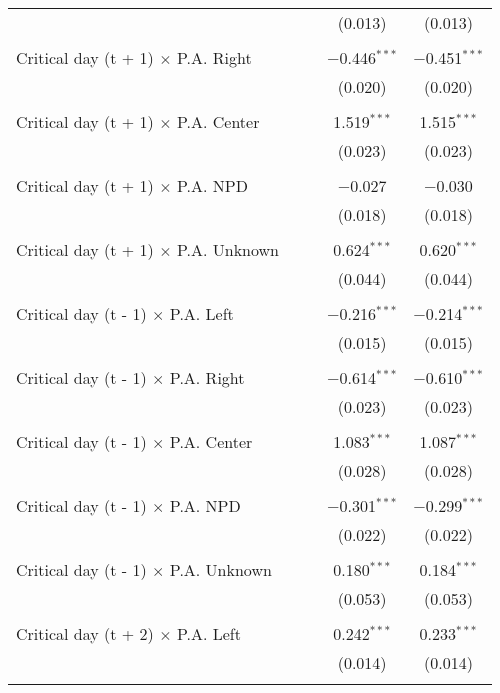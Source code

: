 \documentclass[
]{article}
\begin{document}
\begin{table}[!htbp]
{\begin{tabular}{@{\extracolsep{5pt}}lcccc}
  &  &  & (0.013) & (0.013) \\ 
  & & & & \\ 
 Critical day (t + 1) $\times$ P.A. Right &  &  & $-$0.446$^{***}$ & $-$0.451$^{***}$ \\ 
  &  &  & (0.020) & (0.020) \\ 
  & & & & \\ 
 Critical day (t + 1) $\times$ P.A. Center &  &  & 1.519$^{***}$ & 1.515$^{***}$ \\ 
  &  &  & (0.023) & (0.023) \\ 
  & & & & \\ 
 Critical day (t + 1) $\times$ P.A. NPD &  &  & $-$0.027 & $-$0.030 \\ 
  &  &  & (0.018) & (0.018) \\ 
  & & & & \\ 
 Critical day (t + 1) $\times$ P.A. Unknown &  &  & 0.624$^{***}$ & 0.620$^{***}$ \\ 
  &  &  & (0.044) & (0.044) \\ 
  & & & & \\ 
 Critical day (t - 1) $\times$ P.A. Left &  &  & $-$0.216$^{***}$ & $-$0.214$^{***}$ \\ 
  &  &  & (0.015) & (0.015) \\ 
  & & & & \\ 
 Critical day (t - 1) $\times$ P.A. Right &  &  & $-$0.614$^{***}$ & $-$0.610$^{***}$ \\ 
  &  &  & (0.023) & (0.023) \\ 
  & & & & \\ 
 Critical day (t - 1) $\times$ P.A. Center &  &  & 1.083$^{***}$ & 1.087$^{***}$ \\ 
  &  &  & (0.028) & (0.028) \\ 
  & & & & \\ 
 Critical day (t - 1) $\times$ P.A. NPD &  &  & $-$0.301$^{***}$ & $-$0.299$^{***}$ \\ 
  &  &  & (0.022) & (0.022) \\ 
  & & & & \\ 
 Critical day (t - 1) $\times$ P.A. Unknown &  &  & 0.180$^{***}$ & 0.184$^{***}$ \\ 
  &  &  & (0.053) & (0.053) \\ 
  & & & & \\ 
 Critical day (t + 2) $\times$ P.A. Left &  &  & 0.242$^{***}$ & 0.233$^{***}$ \\ 
  &  &  & (0.014) & (0.014) \\ 
  & & & & \\ 

\end{tabular}}
\end{table}
\end{document}
